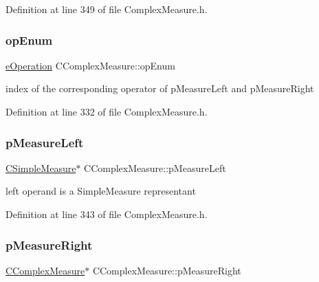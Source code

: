Definition at line 349 of file Complex\+Measure.\+h.

\mbox{\label{classCComplexMeasure_ae22369976a7e5570add11a4172dcf062}} 
\subsubsection{\texorpdfstring{op\+Enum}{opEnum}}
{\footnotesize\ttfamily \hyperlink{MeasureOperator_8h_a1431c79e3ad4b4c5bcc9f31f188538f2}{e\+Operation} C\+Complex\+Measure\+::op\+Enum\hspace{0.3cm}{\ttfamily [protected]}}



index of the corresponding operator of p\+Measure\+Left and p\+Measure\+Right 



Definition at line 332 of file Complex\+Measure.\+h.

\mbox{\label{classCComplexMeasure_a4d68f86891a036df81f5b1a344c36f27}} 
\subsubsection{\texorpdfstring{p\+Measure\+Left}{pMeasureLeft}}
{\footnotesize\ttfamily \hyperlink{classCSimpleMeasure}{C\+Simple\+Measure}$\ast$ C\+Complex\+Measure\+::p\+Measure\+Left\hspace{0.3cm}{\ttfamily [protected]}}



left operand is a Simple\+Measure representant 



Definition at line 343 of file Complex\+Measure.\+h.

\mbox{\label{classCComplexMeasure_abbafc4b16676d223ed34860b8ece1b6b}} 
\subsubsection{\texorpdfstring{p\+Measure\+Right}{pMeasureRight}}
{\footnotesize\ttfamily \hyperlink{classCComplexMeasure}{C\+Complex\+Measure}$\ast$ C\+Complex\+Measure\+::p\+Measure\+Right\hspace{0.3cm}{\ttfamily [protected]}}



